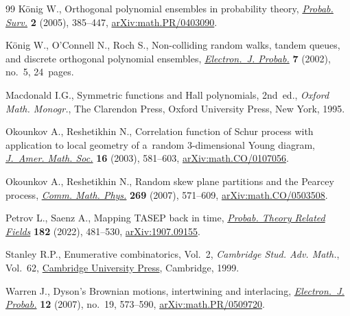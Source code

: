 \documentclass[pdftex]{sigma}
\numberwithin{equation}{section}
\begin{document}
\begin{thebibliography}{99}
K\"onig W., Orthogonal polynomial ensembles in probability theory,
 \href{https://doi.org/10.1214/154957805100000177}{\textit{Probab. Surv.}} \textbf{2} (2005), 385--447, \href{https://arxiv.org/abs/math.PR/0403090}{arXiv:math.PR/0403090}.

K\"onig W., O'Connell N., Roch S., Non-colliding random walks, tandem queues,
 and discrete orthogonal polynomial ensembles, \href{https://doi.org/10.1214/EJP.v7-104}{\textit{Electron.~J. Probab.}}
 \textbf{7} (2002), no.~5, 24~pages.

Macdonald I.G., Symmetric functions and {H}all polynomials, 2nd~ed., \textit{Oxford Math. Monogr.}, The Clarendon Press, Oxford University Press, New
 York, 1995.

Okounkov A., Reshetikhin N., Correlation function of {S}chur process with
 application to local geometry of a~random 3-dimensional {Y}oung diagram,
 \href{https://doi.org/10.1090/S0894-0347-03-00425-9}{\textit{J.~Amer. Math. Soc.}} \textbf{16} (2003), 581--603,
 \href{https://arxiv.org/abs/math.CO/0107056}{arXiv:math.CO/0107056}.

Okounkov A., Reshetikhin N., Random skew plane partitions and the {P}earcey
 process, \href{https://doi.org/10.1007/s00220-006-0128-8}{\textit{Comm. Math. Phys.}} \textbf{269} (2007), 571--609,
 \href{https://arxiv.org/abs/math.CO/0503508}{arXiv:math.CO/0503508}.

Petrov L., Saenz A., Mapping {TASEP} back in time, \href{https://doi.org/10.1007/s00440-021-01074-0}{\textit{Probab. Theory
 Related Fields}} \textbf{182} (2022), 481--530, \href{https://arxiv.org/abs/1907.09155}{arXiv:1907.09155}.

Stanley R.P., Enumerative combinatorics, {V}ol.~2, \textit{Cambridge Stud. Adv.
 Math.}, Vol.~62, \href{https://doi.org/10.1017/CBO9780511609589}{Cambridge University Press}, Cambridge, 1999.

Warren J., Dyson's {B}rownian motions, intertwining and interlacing,
 \href{https://doi.org/10.1214/EJP.v12-406}{\textit{Electron.~J. Probab.}} \textbf{12} (2007), no.~19, 573--590,
 \href{https://arxiv.org/abs/math.PR/0509720}{arXiv:math.PR/0509720}.

\end{thebibliography}\LastPageEnding
\end{document}
